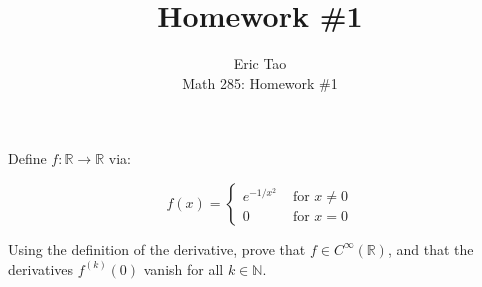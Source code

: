 \documentclass[10pt]{article}
\newenvironment{problem}[2][]{\begin{trivlist}
\item[\hskip \labelsep {\bfseries #1}\hskip \labelsep {\bfseries #2.}]}{\end{trivlist}}
\begin{document}
 
\title{Homework \#1}
\author{Eric Tao\\
Math 285: Homework \#1}
\maketitle

\begin{problem}{Question 1}

Define $f: \mathbb{R} \to \mathbb{R}$ via:

$$ f(x) = \begin{cases} e^{-1/x^2} & \text{ for } x \neq 0 \\ 0 & \text{ for } x = 0\end{cases}$$

Using the definition of the derivative, prove that $f \in C^\infty(\mathbb{R})$, and that the derivatives $f^{(k)}(0)$ vanish for all $k \in \mathbb{N}$. 

\end{problem}
\end{document}
